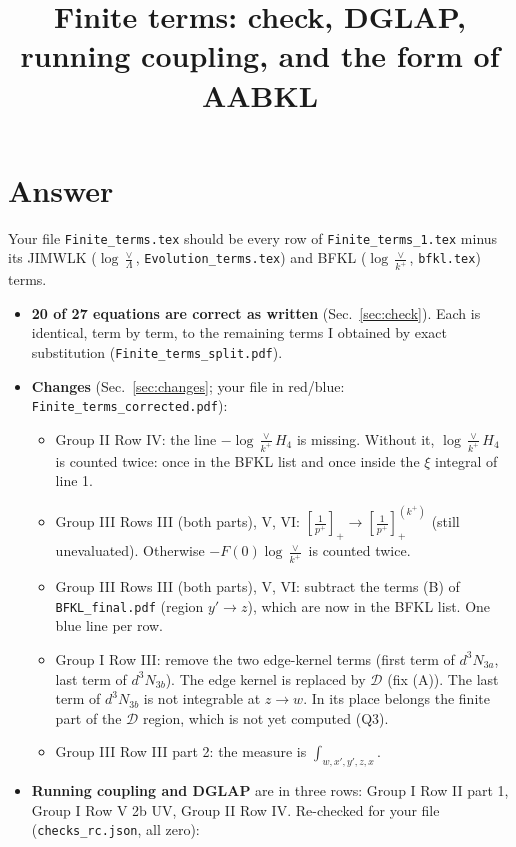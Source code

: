 \documentclass[9pt]{article}
\title{Finite terms: check, DGLAP, running coupling, and the form of AABKL}
\author{}
\date{}
\numberwithin{equation}{section}
\begin{document}
\maketitle
\sloppy

\section{Answer}\label{sec:answer}
Your file \texttt{Finite\_terms.tex} should be every row of \texttt{Finite\_terms\_1.tex} minus its JIMWLK ($\log\frac{\vee}{\Lambda}$, \texttt{Evolution\_terms.tex}) and BFKL ($\log\frac{\vee}{k^+}$, \texttt{bfkl.tex}) terms.
\begin{itemize}
\item \textbf{20 of 27 equations are correct as written} (Sec.~\ref{sec:check}). Each is identical, term by term, to the remaining terms I obtained by exact substitution (\texttt{Finite\_terms\_split.pdf}).
\item \textbf{Changes} (Sec.~\ref{sec:changes}; your file in red/blue: \texttt{Finite\_terms\_corrected.pdf}):
\begin{itemize}
\item[C1] Group II Row IV: the line $-\log\frac{\vee}{k^+}H_4$ is missing. Without it, $\log\frac{\vee}{k^+}H_4$ is counted twice: once in the BFKL list and once inside the $\xi$ integral of line 1.
\item[C2] Group III Rows III (both parts), V, VI: $\left[\frac{1}{p^+}\right]_+\to\left[\frac{1}{p^+}\right]_+^{(k^+)}$ (still unevaluated). Otherwise $-F(0)\log\frac{\vee}{k^+}$ is counted twice.
\item[C3] Group III Rows III (both parts), V, VI: subtract the terms (B) of \texttt{BFKL\_final.pdf} (region $y'\to z$), which are now in the BFKL list. One blue line per row.
\item[C4] Group I Row III: remove the two edge-kernel terms (first term of $d^3N_{3a}$, last term of $d^3N_{3b}$). The edge kernel is replaced by $\mathcal D$ (fix (A)). The last term of $d^3N_{3b}$ is not integrable at $z\to w$. In its place belongs the finite part of the $\mathcal D$ region, which is not yet computed (Q3).
\item[C5] Group III Row III part 2: the measure is $\int_{w,x',y',z,x}$.
\end{itemize}
\item \textbf{Running coupling and DGLAP} are in three rows: Group I Row II part 1, Group I Row V 2b UV, Group II Row IV. Re-checked for your file (\texttt{checks\_rc.json}, all zero):

\end{itemize}
\end{document}
